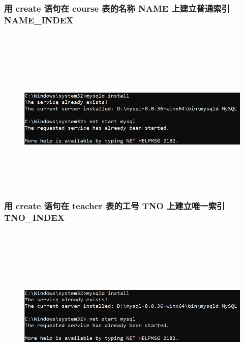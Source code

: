 \documentclass{ctexart}
\begin{document}
\subsubsection{用 create 语句在 course 表的名称 NAME 上建立普通索引 NAME\_INDEX}
\begin{lstlisting}[language=sql]
	
\end{lstlisting}
\begin{figure}[H]
	\centering 
	\includegraphics[height=7cm,width=14cm]{1.png}
	\end{figure}
\subsubsection{用 create 语句在 teacher 表的工号 TNO 上建立唯一索引 TNO\_INDEX}
\begin{lstlisting}[language=sql]
	
\end{lstlisting}
\begin{figure}[H]
	\centering 
	\includegraphics[height=7cm,width=14cm]{1.png}
	\end{figure}
\end{document}
